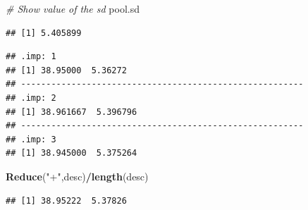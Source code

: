\documentclass[]{book}
\newenvironment{Shaded}{\begin{snugshade}}{\end{snugshade}}
\newcommand{\KeywordTok}[1]{\textcolor[rgb]{0.13,0.29,0.53}{\textbf{#1}}}
\newcommand{\DataTypeTok}[1]{\textcolor[rgb]{0.13,0.29,0.53}{#1}}
\newcommand{\DecValTok}[1]{\textcolor[rgb]{0.00,0.00,0.81}{#1}}
\newcommand{\StringTok}[1]{\textcolor[rgb]{0.31,0.60,0.02}{#1}}
\newcommand{\CommentTok}[1]{\textcolor[rgb]{0.56,0.35,0.01}{\textit{#1}}}
\newcommand{\OtherTok}[1]{\textcolor[rgb]{0.56,0.35,0.01}{#1}}
\newcommand{\ControlFlowTok}[1]{\textcolor[rgb]{0.13,0.29,0.53}{\textbf{#1}}}
\newcommand{\OperatorTok}[1]{\textcolor[rgb]{0.81,0.36,0.00}{\textbf{#1}}}
\newcommand{\NormalTok}[1]{#1}
\theoremstyle{definition}
\theoremstyle{definition}
\theoremstyle{definition}
\theoremstyle{remark}
\begin{document}
\begin{Shaded}
\begin{Highlighting}[]
\CommentTok{# Show value of the sd}
\NormalTok{pool.sd}
\end{Highlighting}
\end{Shaded}

\begin{verbatim}
## [1] 5.405899
\end{verbatim}

\begin{Shaded}
\end{Shaded}

\begin{verbatim}
## .imp: 1
## [1] 38.95000  5.36272
## -------------------------------------------------------- 
## .imp: 2
## [1] 38.961667  5.396796
## -------------------------------------------------------- 
## .imp: 3
## [1] 38.945000  5.375264
\end{verbatim}

\begin{Shaded}
\begin{Highlighting}[]
\KeywordTok{Reduce}\NormalTok{(}\StringTok{"+"}\NormalTok{,desc)}\OperatorTok{/}\KeywordTok{length}\NormalTok{(desc)}
\end{Highlighting}
\end{Shaded}

\begin{verbatim}
## [1] 38.95222  5.37826
\end{verbatim}
\end{document}
